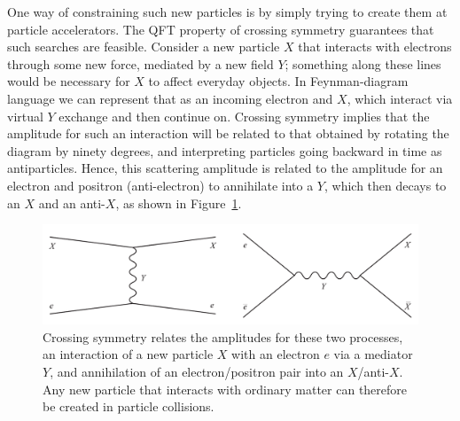 \documentclass[12pt,letterpaper]{article}
\begin{document}
One way of constraining such new particles is by simply trying to create them at particle accelerators.
The QFT property of crossing symmetry guarantees that such searches are feasible.
Consider a new particle $X$ that interacts with electrons through some new force, mediated by a new field $Y$; something along these lines would be necessary for $X$ to affect everyday objects.
In Feynman-diagram language we can represent that as an incoming electron and $X$, which interact via virtual $Y$ exchange and then continue on.
Crossing symmetry implies that the amplitude for such an interaction will be related to that obtained by rotating the diagram by ninety degrees, and interpreting particles going backward in time as antiparticles.
Hence, this scattering amplitude is related to the amplitude for an electron and positron (anti-electron) to annihilate into a $Y$, which then decays to an $X$ and an anti-$X$, as shown in Figure~\ref{fig:crossing}.

\begin{figure}[h]
\centering
\includegraphics[width=.80\textwidth, valign=c]{newparticle}
\caption{\small Crossing symmetry relates the amplitudes for these two processes, an interaction of a new particle $X$ with an electron $e$ via a mediator $Y$, and annihilation of an electron/positron pair into an $X$/anti-$X$. Any new particle that interacts with ordinary matter can therefore be created in particle collisions.}
\label{fig:crossing}
\end{figure}
\end{document}
